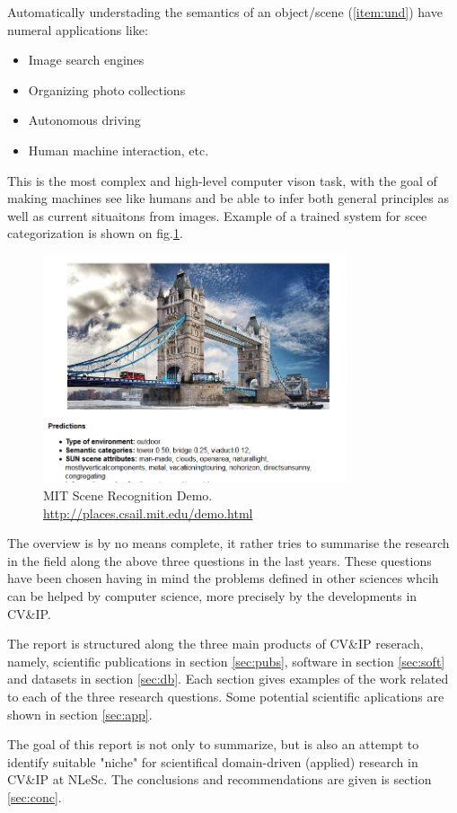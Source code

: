 Automatically understading the semantics of an object/scene (\ref{item:und}) have numeral applications like:
\begin{itemize}
\item Image search engines
\item Organizing photo collections
\item Autonomous driving
\item Human machine interaction, etc.
\end{itemize}

This is the most complex and high-level computer vison task, with the goal of making machines see like humans and be able to infer both general principles as well as current situaitons from images. Example of a trained system for scee categorization is shown on fig.\ref{fig:mitdemo}.
\begin{figure}[H]
\begin{center}
\includegraphics[width=0.8\textwidth]{fig/mitdemo}
\end{center}
\caption{MIT Scene Recognition Demo. \url{http://places.csail.mit.edu/demo.html}}
\label{fig:mitdemo}
\end{figure}

The overview is by no means complete, it rather tries to summarise the research in the field along the above three questions in the last years. 
These questions have been chosen having in mind the problems defined in other sciences whcih can be helped by computer science, more precisely by the developments in CV\&IP.

The report is structured along the three main products of CV\&IP reserach, namely, scientific publications in section \ref{sec:pubs}, software in section \ref{sec:soft} and datasets in section \ref{sec:db}. Each section gives examples of the work related to each of the three research questions. Some potential scientific aplications are shown in section \ref{sec:app}.

The goal of this report is not only to summarize, but is also an attempt to identify suitable "niche" for scientifical domain-driven (applied) research in CV\&IP at NLeSc. The conclusions and recommendations are given is section \ref{sec:conc}.